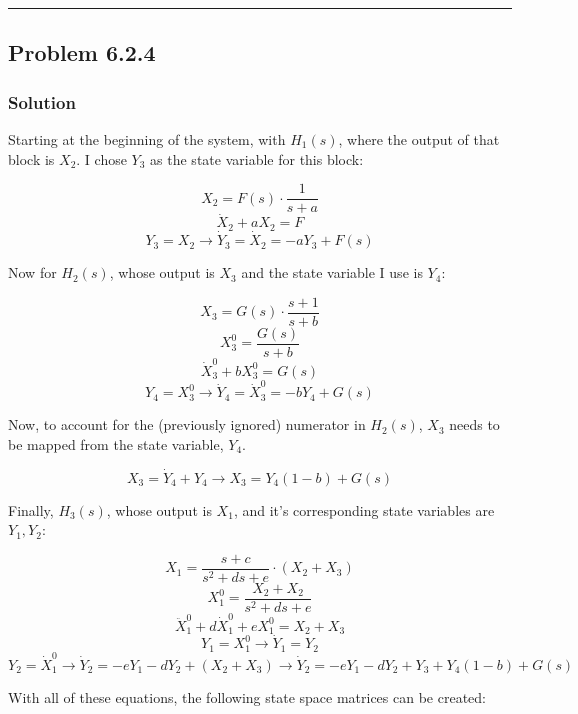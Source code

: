 \documentclass[11pt]{article}
\begin{document}
    \begin{center}\rule{0.5\linewidth}{\linethickness}\end{center}

\hypertarget{problem-6.2.4}{%
\subsection{Problem 6.2.4}\label{problem-6.2.4}}

\hypertarget{solution}{%
\subsubsection{Solution}\label{solution}}

Starting at the beginning of the system, with \(H_1(s)\), where the
output of that block is \(X_2\). I chose \(Y_3\) as the state variable
for this block:

\[X_2=F(s)\cdot \frac{1}{s+a}\] \[\dot{X}_2+aX_2=F\]
\[Y_3=X_2 \rightarrow \dot{Y}_3=\dot{X}_2=-aY_3+F(s)\]

Now for \(H_2(s)\), whose output is \(X_3\) and the state variable I use
is \(Y_4\):

\[X_3=G(s)\cdot \frac{s+1}{s+b}\] \[X_3^0=\frac{G(s)}{s+b}\]
\[\dot{X}_3^0+bX_3^0=G(s)\]
\[Y_4=X_3^0 \rightarrow \dot{Y}_4=\dot{X}_3^0=-bY_4+G(s)\]

Now, to account for the (previously ignored) numerator in \(H_2(s)\),
\(X_3\) needs to be mapped from the state variable, \(Y_4\).

\[X_3=\dot{Y}_4+Y_4\rightarrow X_3=Y_4(1-b)+G(s)\]

Finally, \(H_3(s)\), whose output is \(X_1\), and it's corresponding
state variables are \(Y_1, Y_2\):

\[X_1 = \frac{s+c}{s^2+ds+e}\cdot (X_2+X_3)\]
\[X_1^0=\frac{X_2+X_2}{s^2+ds+e}\]
\[\ddot{X}_1^0+d\dot{X}_1^0+eX_1^0=X_2+X_3\]
\[Y_1=X_1^0 \rightarrow \dot{Y}_1 = Y_2\]
\[Y_2=\dot{X}_1^0 \rightarrow \dot{Y}_2=-eY_1-dY_2+(X_2+X_3) \rightarrow \dot{Y}_2=-eY_1-dY_2+Y_3+Y_4(1-b)+G(s)\]

With all of these equations, the following state space matrices can be
created:
\end{document}
